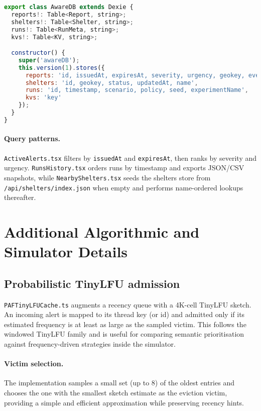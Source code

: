 \begin{lstlisting}[language=JavaScript, caption={AWARE database definition in `src/db.ts`}]
export class AwareDB extends Dexie {
  reports!: Table<Report, string>;
  shelters!: Table<Shelter, string>;
  runs!: Table<RunMeta, string>;
  kvs!: Table<KV, string>;

  constructor() {
    super('awareDB');
    this.version(1).stores({
      reports: 'id, issuedAt, expiresAt, severity, urgency, geokey, eventType',
      shelters: 'id, geokey, status, updatedAt, name',
      runs: 'id, timestamp, scenario, policy, seed, experimentName',
      kvs: 'key'
    });
  }
}
\end{lstlisting}

\paragraph{Query patterns.}
\texttt{ActiveAlerts.tsx} filters by \texttt{issuedAt} and \texttt{expiresAt}, then ranks by severity and urgency. \texttt{RunsHistory.tsx} orders runs by timestamp and exports JSON/CSV snapshots, while \texttt{NearbyShelters.tsx} seeds the shelters store from \texttt{/api/shelters/index.json} when empty and performs name-ordered lookups thereafter.

\section{Additional Algorithmic and Simulator Details}

\subsection{Probabilistic TinyLFU admission}
\texttt{PAFTinyLFUCache.ts} augments a recency queue with a 4K-cell TinyLFU sketch. An incoming alert is mapped to its thread key (or id) and admitted only if its estimated frequency is at least as large as the sampled victim. This follows the windowed TinyLFU family \cite{einziger-2017-wtinylfu} and is useful for comparing semantic prioritisation against frequency-driven strategies inside the simulator.

\paragraph{Victim selection.} The implementation samples a small set (up to 8) of the oldest entries and chooses the one with the smallest sketch estimate as the eviction victim, providing a simple and efficient approximation while preserving recency hints.

